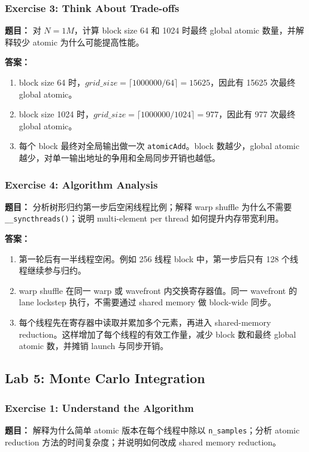 \documentclass[10pt,a4paper]{article}
\begin{document}
\subsubsection{Exercise 3: Think About Trade-offs}
\noindent\textbf{题目：} 对 $N=1M$，计算 block size 64 和 1024 时最终 global atomic 数量，并解释较少 atomic 为什么可能提高性能。

\noindent\textbf{答案：}
\begin{enumerate}[label=\arabic*.]
\item block size 64 时，$grid\_size=\lceil1000000/64\rceil=15625$，因此有 15625 次最终 global atomic。
\item block size 1024 时，$grid\_size=\lceil1000000/1024\rceil=977$，因此有 977 次最终 global atomic。
\item 每个 block 最终对全局输出做一次 \texttt{atomicAdd}。block 数越少，global atomic 越少，对单一输出地址的争用和全局同步开销也越低。
\end{enumerate}

\subsubsection{Exercise 4: Algorithm Analysis}
\noindent\textbf{题目：} 分析树形归约第一步后空闲线程比例；解释 warp shuffle 为什么不需要 \texttt{\_\_syncthreads()}；说明 multi-element per thread 如何提升内存带宽利用。

\noindent\textbf{答案：}
\begin{enumerate}[label=\arabic*.]
\item 第一轮后有一半线程空闲。例如 256 线程 block 中，第一步后只有 128 个线程继续参与归约。
\item warp shuffle 在同一 warp 或 wavefront 内交换寄存器值。同一 wavefront 的 lane lockstep 执行，不需要通过 shared memory 做 block-wide 同步。
\item 每个线程先在寄存器中读取并累加多个元素，再进入 shared-memory reduction。这样增加了每个线程的有效工作量，减少 block 数和最终 global atomic 数，并摊销 launch 与同步开销。
\end{enumerate}

\subsection{Lab 5: Monte Carlo Integration}

\subsubsection{Exercise 1: Understand the Algorithm}
\noindent\textbf{题目：} 解释为什么简单 atomic 版本在每个线程中除以 \texttt{n\_samples}；分析 atomic reduction 方法的时间复杂度；并说明如何改成 shared memory reduction。
\end{document}
